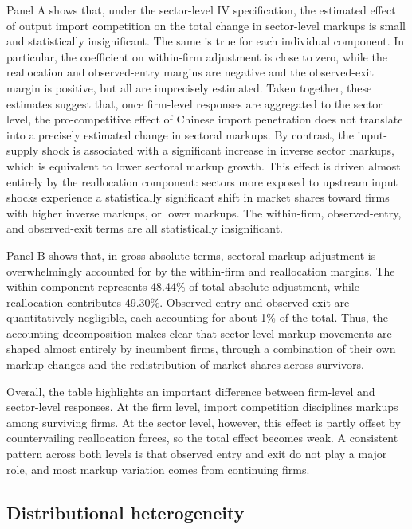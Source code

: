 ﻿\documentclass[12pt]{article}
\begin{document}
Panel A shows that, under the sector-level IV specification, the estimated effect of output import competition on the total change in sector-level markups is small and statistically insignificant. The same is true for each individual component. In particular, the coefficient on within-firm adjustment is close to zero, while the reallocation and observed-entry margins are negative and the observed-exit margin is positive, but all are imprecisely estimated. Taken together, these estimates suggest that, once firm-level responses are aggregated to the sector level, the pro-competitive effect of Chinese import penetration does not translate into a precisely estimated change in sectoral markups. By contrast, the input-supply shock is associated with a significant increase in inverse sector markups, which is equivalent to lower sectoral markup growth. This effect is driven almost entirely by the reallocation component: sectors more exposed to upstream input shocks experience a statistically significant shift in market shares toward firms with higher inverse markups, or lower markups. The within-firm, observed-entry, and observed-exit terms are all statistically insignificant.

Panel B shows that, in gross absolute terms, sectoral markup adjustment is overwhelmingly accounted for by the within-firm and reallocation margins. The within component represents 48.44\% of total absolute adjustment, while reallocation contributes 49.30\%. Observed entry and observed exit are quantitatively negligible, each accounting for about 1\% of the total. Thus, the accounting decomposition makes clear that sector-level markup movements are shaped almost entirely by incumbent firms, through a combination of their own markup changes and the redistribution of market shares across survivors.

Overall, the table highlights an important difference between firm-level and sector-level responses. At the firm level, import competition disciplines markups among surviving firms. At the sector level, however, this effect is partly offset by countervailing reallocation forces, so the total effect becomes weak. A consistent pattern across both levels is that observed entry and exit do not play a major role, and most markup variation comes from continuing firms.


\subsection{Distributional heterogeneity}
\label{sec:distributional_results}
\end{document}
